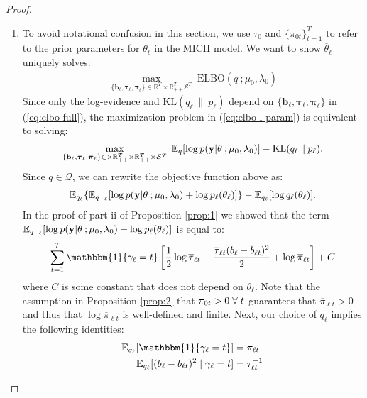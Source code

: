 \begin{proof}
\begin{enumerate}[label=\roman*.]
\item To avoid notational confusion in this section, we use $\tau_0$ and $\{\pi_{0t}\}_{t=1}^T$ to refer to the prior parameters for $\theta_\ell$ in the MICH model. We want to show $\overline{\theta}_\ell$ uniquely solves: 
\begin{align}
    \max_{\{\mathbf{b}_\ell, \boldsymbol{\tau}_\ell, \boldsymbol{\pi}_\ell\} \in \mathbb{R}^T\times\mathbb{R}_{++}^T\mathcal{S}^T} \;  \text{ELBO}(q\:;\mu_0,\lambda_0) \label{eq:elbo-l-param}
\end{align}
Since only the log-evidence and $\text{KL}(q_\ell\:\lVert\: p_\ell)$ depend on $\{\mathbf{b}_\ell, \boldsymbol{\tau}_\ell, \boldsymbol{\pi}_\ell\}$ in (\ref{eq:elbo-full}), the maximization problem in (\ref{eq:elbo-l-param}) is equivalent to solving: 
\begin{align*}
    \max_{\{\mathbf{b}_\ell, \boldsymbol{\tau}_\ell, \boldsymbol{\pi}_\ell\} \in \times\mathbb{R}_{++}^T\times\mathbb{R}_{++}^T \times\mathcal{S}^T} \;  \mathbb{E}_q[\log p(\mathbf{y}| \theta\:; \mu_0,\lambda_0)] - \text{KL}(q_\ell\:\lVert\: p_\ell).
\end{align*}
Since $q \in \mathcal{Q}$, we can rewrite the objective function above as:
\begin{align*}
    \mathbb{E}_{q_\ell}\{\mathbb{E}_{q_{-\ell}}[\log p(\mathbf{y}| \theta\:; \mu_0,\lambda_0)+\log p_\ell(\theta_\ell)]\} - \mathbb{E}_{q_\ell}[\log q_\ell(\theta_\ell)].
\end{align*}
In the proof of part ii of Proposition \ref{prop:1} we showed that the term $\mathbb{E}_{q_{-\ell}}[\log p(\mathbf{y}| \theta\:; \mu_0,\lambda_0)+\log p_\ell(\theta_\ell)]$ is equal to:
\begin{align*}
     \sum_{t=1}^T \mathbbm{1}\{\gamma_\ell = t\}\left[\frac{1}{2} \log \overline{\tau}_{\ell t} - \frac{\overline{\tau}_{\ell t}(b_{\ell } - \overline{b}_{\ell t})^2}{2} + \log \overline{\pi}_{\ell t}\right] + C
\end{align*}
where $C$ is some constant that does not depend on $\theta_\ell$. Note that the assumption in Proposition \ref{prop:2} that $\pi_{0t} > 0 \;\forall\; t$ guarantees that $\overline{\pi}_{\ell t} > 0$ and thus that $\log \overline{\pi}_{\ell t}$ is well-defined and finite. Next, our choice of $q_\ell$ implies the following identities:
\begin{align*}
    \E_{q_\ell}[\mathbbm{1}\{\gamma_\ell = t\}] &= \pi_{\ell t} \\
    \E_{q_\ell}[(b_\ell - b_{\ell t})^2\;|\;\gamma_\ell=t] &= \tau_{\ell t}^{-1}\\

\end{align*}
\end{enumerate}
\end{proof}
